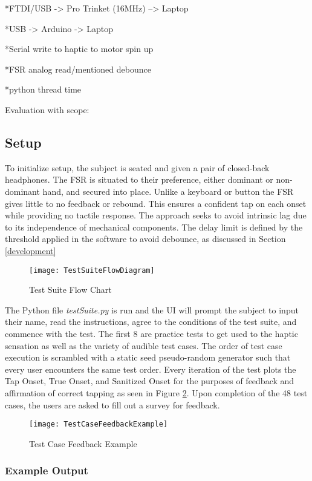     *FTDI/USB -> Pro Trinket (16MHz) --> Laptop

    *USB -> Arduino -> Laptop

    *Serial write to haptic to motor spin up

    *FSR analog read/mentioned debounce

    *python thread time

    Evaluation with scope:

\subsection{Setup} \label{testSetup}
To initialize setup, the subject is seated and given a pair of closed-back headphones. The FSR is situated to their preference, either dominant or non-dominant hand, and secured into place. Unlike a keyboard or button the FSR gives little to no feedback or rebound. This ensures a confident tap on each onset while providing no tactile response. The approach seeks to avoid intrinsic lag due to its independence of mechanical components. The delay limit is defined by the threshold applied in the software to avoid debounce, as discussed in Section \ref{development}

\begin{figure}[H]
    \centering
    \texttt{[image: TestSuiteFlowDiagram]}
    \caption{Test Suite Flow Chart}
    \label{fig:TestSuiteFlowDiagram}
\end{figure}

The Python file \textit{testSuite.py} is run and the UI will prompt the subject to input their name, read the instructions, agree to the conditions of the test suite, and commence with the test. The first 8 are practice tests to get used to the haptic sensation as well as the variety of audible test cases. The order of test case execution is scrambled with a static seed pseudo-random generator such that every user encounters the same test order. Every iteration of the test plots the Tap Onset, True Onset, and Sanitized Onset  for the purposes of feedback and affirmation of correct tapping as seen in Figure \ref{fig:TestCaseFeedbackEx}. Upon completion of the 48 test cases, the users are asked to fill out a survey for feedback.

\begin{figure}[]
    \centering
    \texttt{[image: TestCaseFeedbackExample]}
    \caption{Test Case Feedback Example}
    \label{fig:TestCaseFeedbackEx}
\end{figure}

\subsubsection{Example Output}
